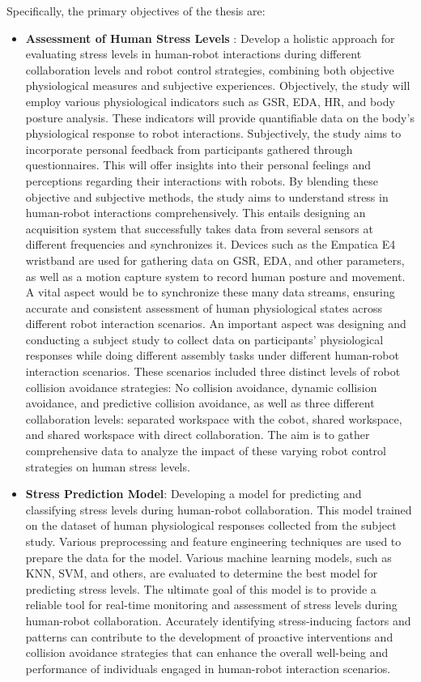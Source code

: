 Specifically, the primary objectives of the thesis are: 
\begin{itemize}
	\item \textbf{Assessment of Human Stress Levels }: Develop a holistic approach for evaluating stress levels in human-robot interactions during different collaboration levels and robot control strategies, combining both objective physiological measures and subjective experiences. Objectively, the study will employ various physiological indicators such as \gls{GSR}, \gls{EDA}, \gls{HR}, and body posture analysis. These indicators will provide quantifiable data on the body's physiological response to robot interactions. Subjectively, the study aims to incorporate personal feedback from participants gathered through questionnaires. This will offer insights into their personal feelings and perceptions regarding their interactions with robots. By blending these objective and subjective methods, the study aims to understand stress in human-robot interactions comprehensively.
    This entails designing an acquisition system that successfully takes data from several sensors at different frequencies and synchronizes it. Devices such as the Empatica E4 wristband are used for gathering data on \gls{GSR}, \gls{EDA}, and other parameters, as well as a motion capture system to record human posture and movement. A vital aspect would be to synchronize these many data streams, ensuring accurate and consistent assessment of human physiological states across different robot interaction scenarios. 
    An important aspect was designing and conducting a subject study to collect data on participants' physiological responses while doing different assembly tasks under different human-robot interaction scenarios. These scenarios included three distinct levels of robot collision avoidance strategies: No collision avoidance, dynamic collision avoidance, and predictive collision avoidance, as well as three different collaboration levels: separated workspace with the cobot, shared workspace, and shared workspace with direct collaboration. The aim is to gather comprehensive data to analyze the impact of these varying robot control strategies on human stress levels. 
    \item \textbf{Stress Prediction Model}: Developing a model for predicting and classifying stress levels during human-robot collaboration. This model trained on the dataset of human physiological responses collected from the subject study. Various preprocessing and feature engineering techniques are used to prepare the data for the model.
    Various machine learning models, such as \gls{KNN}, \gls{SVM}, and others, are evaluated to determine the best model for predicting stress levels. The ultimate goal of this model is to provide a reliable tool for real-time monitoring and assessment of stress levels during human-robot collaboration. Accurately identifying stress-inducing factors and patterns can contribute to the development of proactive interventions and collision avoidance strategies that can enhance the overall well-being and performance of individuals engaged in human-robot interaction scenarios.

  \end{itemize}

